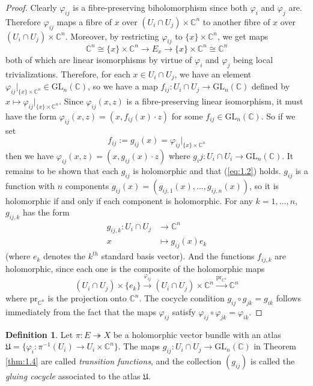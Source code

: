 \documentclass[10pt]{amsart}
\numberwithin{equation}{section}
\def\To#1{\xrightarrow{#1}}
\newcommand{\vp}{\varphi}
\newcommand{\C}{\mathbb{C}}
\newcommand{\epi}{\twoheadrightarrow}
\newcommand{\GL}{\mathrm{GL}}
\newcommand{\pr}{\mathrm{pr}}
\theoremstyle{plain}
\theoremstyle{definition}
\newtheorem{defn}[thm]{Definition}
\theoremstyle{remark}
\begin{document}
\begin{proof}
    Clearly $\vp_{ij}$ is a fibre-preserving biholomorphism since both $\vp_i$ and $\vp_j$ are. Therefore $\vp_{ij}$ maps a fibre of $x$ over $(U_i \cap U_j) \times \C^n$ to another fibre of $x$ over $(U_i \cap U_j) \times \C^n$. Moreover, by restricting $\vp_{ij}$ to $\{x\} \times \C^n$, we get maps
    \[\C^n \cong \{x\} \times \C^n \to E_x \to \{x\} \times \C^n \cong \C^n\]
    both of which are linear isomorphisms by virtue of $\vp_i$ and $\vp_j$ being local trivializations. Therefore, for each $x \in U_i \cap U_j$, we have an element $\vp_{ij}|_{\{x\} \times \C^n} \in \GL_n(\C)$, so we have a map $f_{ij}: U_i \cap U_j \to \GL_n(\C)$ defined by $x \mapsto \vp_{ij}|_{\{x\} \times \C^n}$. Since $\vp_{ij}(x, z)$ is a fibre-preserving linear isomorphism, it must have the form $\vp_{ij}(x, z) = (x, f_{ij}(x) \cdot z)$ for some $f_{ij} \in \GL_n(\C)$. So if we set 
    \[f_{ij} := g_{ij}(x) = \vp_{ij}|_{\{x\} \times \C^n}\] 
    then we have $\vp_{ij}(x, z) = (x, g_{ij}(x) \cdot z)$ where $g_ij: U_i \cap U_i \to \GL_n(\C)$. It remains to be shown that each $g_{ij}$ is holomorphic and that (\ref{eq:1.2}) holds. $g_{ij}$ is a function with $n$ components $g_{ij}(x) = (g_{ij, 1}(x), \hdots, g_{ij, n}(x))$, so it is holomorphic if and only if each component is holomorphic. For any $k = 1, \hdots, n$, $g_{ij, k}$ has the form
    \begin{align*}
        g_{ij,k}: U_i \cap U_j &\to \C^n \\ 
        x &\mapsto g_{ij}(x)e_k 
    \end{align*}
    (where $e_k$ denotes the $k^{th}$ standard basis vector). And the functions $f_{ij, k}$ are holomorphic, since each one is the composite of the holomorphic maps
    \[(U_i \cap U_j) \times \{e_k\} \To{\vp_{ij}} (U_i \cap U_j) \times \C^n \To{\pr_{\C^n}} \C^n\]
    where $\pr_{\C^n}$ is the projection onto $\C^n$. The cocycle condition $g_{ij} \circ g_{jk} = g_{ik}$ follows immediately from the fact that the maps $\vp_{ij}$ satisfy $\vp_{ij}\circ \vp_{jk} = \vp_{ik}$.
\end{proof}

\begin{defn}
    Let $\pi: E \epi X$ be a holomorphic vector bundle with an atlas $\mathfrak{U} = \{\vp_i: \pi^{-1}(U_i) \to U_i \times \C^n\}$. The maps $g_{ij}: U_i \cap U_j \to \GL_n(\C)$ in Theorem \ref{thm:1.4} are called \emph{transition functions}, and the collection $(g_{ij})$ is called the \emph{gluing cocycle} associated to the atlas $\mathfrak{U}$.
\end{defn}
\end{document}
